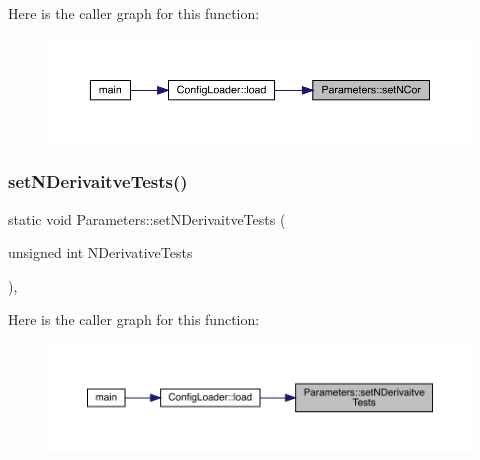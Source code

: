 Here is the caller graph for this function\+:\nopagebreak
\begin{figure}[H]
\begin{center}
\leavevmode
\includegraphics[width=350pt]{class_parameters_afb3ef2dca9d24511a1904bc313fd8513_icgraph}
\end{center}
\end{figure}
\mbox{\label{class_parameters_ae924eabec82bfe600eda893c6f71b00e}} 
\subsubsection{\texorpdfstring{setNDerivaitveTests()}{setNDerivaitveTests()}}
{\footnotesize\ttfamily static void Parameters\+::set\+N\+Derivaitve\+Tests (\begin{DoxyParamCaption}\item[{unsigned int}]{N\+Derivative\+Tests }\end{DoxyParamCaption})\hspace{0.3cm}{\ttfamily [inline]}, {\ttfamily [static]}}

Here is the caller graph for this function\+:\nopagebreak
\begin{figure}[H]
\begin{center}
\leavevmode
\includegraphics[width=350pt]{class_parameters_ae924eabec82bfe600eda893c6f71b00e_icgraph}
\end{center}
\end{figure}
\mbox{\label{class_parameters_a5cbf802e3e5db24cf0b8afc3f39f0830}} 
